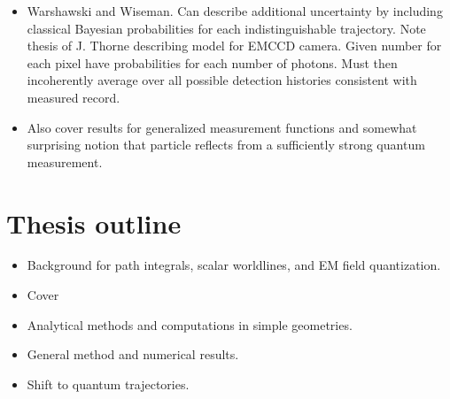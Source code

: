 \begin{itemize}
\item Warshawski and Wiseman.
  Can describe additional uncertainty by including classical Bayesian probabilities for each indistinguishable trajectory.
  Note thesis of J. Thorne describing model for EMCCD camera.
  Given number for each pixel have probabilities for each number of photons.
  Must then incoherently average over all possible detection histories consistent with measured record.
  \cite{Warszawski2002,Warszawski2003a,Warszawski2003b}
\item Also cover results for generalized measurement functions and 
somewhat surprising notion that particle reflects from a sufficiently
strong quantum measurement.
\end{itemize}

\section{Thesis outline}

\begin{itemize}
\item Background for path integrals, scalar worldlines, and EM field quantization.
\item Cover 
\item Analytical methods and computations in simple geometries.
\item General method and numerical results.
\item Shift to quantum trajectories.  
\end{itemize}



